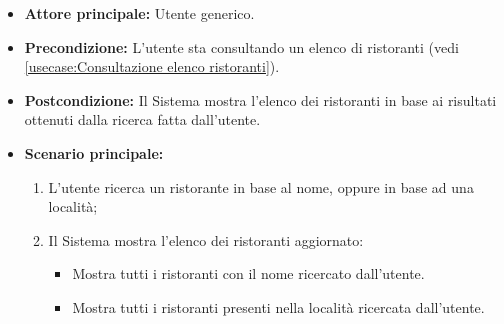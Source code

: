 \label{usecase:Ricerca ristoranti}
\begin{itemize}
	\item \textbf{Attore principale:} Utente generico.
	
	\item \textbf{Precondizione:} L'utente sta consultando un elenco di ristoranti (vedi \autoref{usecase:Consultazione elenco ristoranti}).

	\item \textbf{Postcondizione:} Il Sistema mostra l'elenco dei ristoranti in base ai risultati ottenuti dalla ricerca fatta dall'utente.
 
	      
	\item \textbf{Scenario principale:}
	      \begin{enumerate}
		      \item L'utente ricerca un ristorante in base al nome, oppure in base ad una località;

		      \item Il Sistema mostra l'elenco dei ristoranti aggiornato:
		      \begin{itemize}
                \item Mostra tutti i ristoranti con il nome ricercato dall'utente.
                \item Mostra tutti i ristoranti presenti nella località ricercata dall'utente.
              \end{itemize}
	      \end{enumerate}

\end{itemize}


